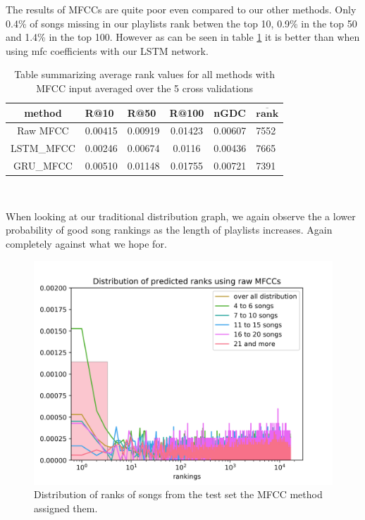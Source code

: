 The results of MFCCs are quite poor even compared to our other methods. Only 0.4\% of songs missing in our playlists rank betwen the top 10, 0.9\% in the top 50 and 1.4\% in the top 100. However as can be seen in table \ref{table:mfcc_methods} it is better than when using mfc coefficients with our LSTM network.
\begin{table}[h!]
\centering
\renewcommand{\arraystretch}{1.5}
\begin{tabu} to 1\textwidth { | c || X[c] | X[c] | c | X[c] | X[c] |}
 \hline
 \textbf{method} & \textbf{R@10} & \textbf{R@50} & \textbf{R@100} & \textbf{nGDC} & $ \boldsymbol{\overline{rank}} $ \\
 \hline
 \hline
 Raw MFCC & 0.00415 & 0.00919 & 0.01423 & 0.00607 &  7552 \\
 \hline
 LSTM\_MFCC & 0.00246 & 0.00674 & 0.0116 & 0.00436 & 7665 \\
 \hline
 GRU\_MFCC & 0.00510 & 0.01148 & 0.01755 & 0.00721 & 7391 \\
 \hline
\end{tabu} \\

\caption{Table summarizing average rank values for all methods with MFCC input averaged over the 5 cross validations}
\label{table:mfcc_methods}
\end{table}

 When looking at our traditional distribution graph, we again observe the a lower probability of good song rankings as the length of playlists increases. Again completely against what we hope for. 
\begin{figure}[h]
    \centering
	\includegraphics[width=120mm]{./img/mfcc_graph.png}
	\caption{Distribution of ranks of songs from the test set the MFCC method assigned them.}
	\label{fig:mfcc_graph}
\end{figure}


